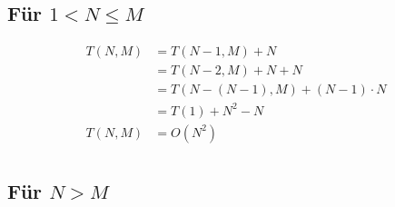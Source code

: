 \documentclass[parskip=half,a4paper]{scrartcl}
\begin{document}
\subsection*{Für $1 < N \le M$}


\begin{equation*}
\begin{aligned}
    T\left(N, M\right) & =  T\left(N-1, M\right) + N\\
& = T\left(N-2, M\right) + N + N\\
& = T\left(N-\left(N-1\right), M\right) + \left(N-1\right) \cdot N\\
& = T\left(1\right) + N^2 - N\\
T(N,M) & = O(N^2)\\
\end{aligned}
\end{equation*}

\subsection*{Für $N > M$}
\end{document}
